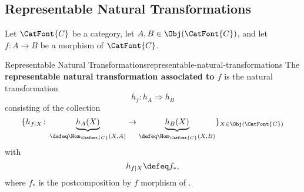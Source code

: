 \subsection{Representable Natural Transformations}\label{subsection-representable-natural-transformations}
Let $\CatFont{C}$ be a category, let $A,B\in\Obj(\CatFont{C})$, and let $f\colon A\to B$ be a morphism of $\CatFont{C}$.
\begin{definition}{Representable Natural Transformations}{representable-natural-transformations}%
    The \textbf{representable natural transformation associated to $f$} is the natural transformation
    \[
        h_{f}%
        \colon%
        h_{A}%
        \Rightarrow%
        h_{B}%
    \]%
    consisting of the collection
    \[
        \{
            h_{f|X}
            \colon
            \underbrace{h_{A}(X)}_{\defeq\Hom_{\CatFont{C}}(X,A)}
            \to
            \underbrace{h_{B}(X)}_{\defeq\Hom_{\CatFont{C}}(X,B)}
        \}_{X\in\Obj(\CatFont{C})}
    \]%
    with
    \[
        h_{f|X}
        \defeq
        f_{*},
    \]%
    where $f_{*}$ is the postcomposition by $f$ morphism of .
\end{definition}

